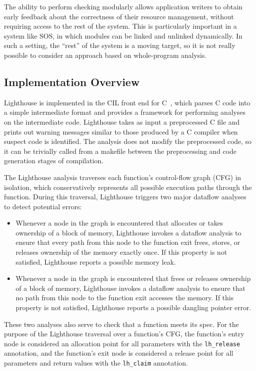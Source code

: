 The ability to perform checking modularly allows application writers
to obtain early feedback about the correctness of their resource
management, without requiring access to the rest of the system.  This
is particularly important in a system like SOS, in which modules can
be linked and unlinked dynamically.  In such a setting, the ``rest''
of the system is a moving target, so it is not really possible to
consider an approach based on whole-program analysis.


\subsection{Implementation Overview}

%
Lighthouse is implemented in the CIL front end for C~\cite{CIL},
which parses C code into a simple intermediate format and provides a
framework for performing analyses on the intermediate code. 
%
Lighthouse takes as input a preprocessed C file and prints out warning
messages similar to those produced by a C compiler when suspect
code is identified.
%
The analysis does not modify the preprocessed code, so it can be
trivially called from a makefile between the preprocessing and code
generation stages of compilation.


The Lighthouse analysis traverses each function's control-flow graph
(CFG) in isolation, which conservatively represents all possible execution
paths through the function.  During this traversal, Lighthouse
triggers two major dataflow analyses to detect potential errors:

\begin{itemize}
\item Whenever a node in the graph is
encountered that allocates or takes ownership of a block of memory,
Lighthouse invokes a dataflow analysis to ensure that every path from
this node to the function exit frees, stores, or releases ownership
of the memory exactly once.  If this property is not satisfied,
Lighthouse reports a possible memory leak.

\item Whenever a node in the graph is encountered that frees or
  releases ownership of a block of memory, Lighthouse invokes a
  dataflow analysis to ensure that no path from this node to the
  function exit accesses the memory.  If this property is not
  satisfied, Lighthouse reports a possible dangling pointer error.
\end{itemize}

These two analyses also serve to check that a function meets its
spec.  For the purpose of the Lighthouse traversal over a function's CFG,
the function's entry node is considered
an allocation point for all parameters with the {\tt lh\_release}
annotation, and the function's exit node is considered a release point
for all parameters and return values with the {\tt lh\_claim}
annotation.  


